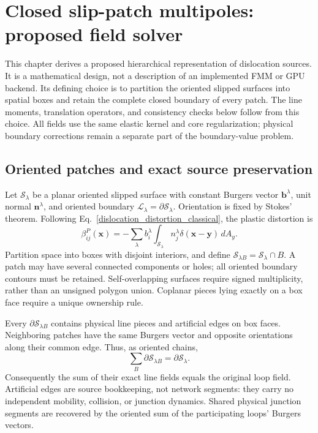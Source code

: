 \chapter{Closed slip-patch multipoles: proposed field solver}
\label{chap:loopAreaMultipoles}

This chapter derives a proposed hierarchical representation of dislocation sources. It is a mathematical design, not a description of an implemented FMM or GPU backend. Its defining choice is to partition the oriented slipped surfaces into spatial boxes and retain the complete closed boundary of every patch. The line moments, translation operators, and consistency checks below follow from this choice. All fields use the same elastic kernel and core regularization; physical boundary corrections remain a separate part of the boundary-value problem.

\section{Oriented patches and exact source preservation}
Let $\mathcal S_\lambda$ be a planar oriented slipped surface with constant Burgers vector $\bm b^\lambda$, unit normal $\bm n^\lambda$, and oriented boundary $\mathcal L_\lambda=\partial\mathcal S_\lambda$. Orientation is fixed by Stokes' theorem. Following Eq.~\eqref{dislocation_distortion_classical}, the plastic distortion is
\begin{equation}
 \beta^P_{ij}(\bm x)=-\sum_\lambda b_i^\lambda
 \int_{\mathcal S_\lambda}n_j^\lambda\delta(\bm x-\bm y)\,dA_y.
 \label{eq:patchPlasticDistortion}
\end{equation}
Partition space into boxes with disjoint interiors, and define $\mathcal S_{\lambda B}=\mathcal S_\lambda\cap B$. A patch may have several connected components or holes; all oriented boundary contours must be retained. Self-overlapping surfaces require signed multiplicity, rather than an unsigned polygon union. Coplanar pieces lying exactly on a box face require a unique ownership rule.

Every $\partial\mathcal S_{\lambda B}$ contains physical line pieces and artificial edges on box faces. Neighboring patches have the same Burgers vector and opposite orientations along their common edge. Thus, as oriented chains,
\begin{equation}
 \sum_B\partial\mathcal S_{\lambda B}=\partial\mathcal S_\lambda.
 \label{eq:patchBoundaryCancellation}
\end{equation}
Consequently the sum of their exact line fields equals the original loop field. Artificial edges are source bookkeeping, not network segments: they carry no independent mobility, collision, or junction dynamics. Shared physical junction segments are recovered by the oriented sum of the participating loops' Burgers vectors.

